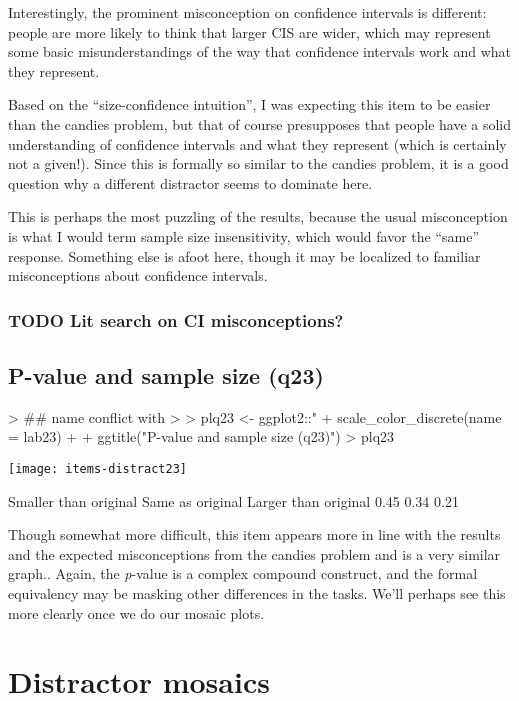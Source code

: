 \documentclass[11pt]{article}
\begin{document}
Interestingly, the prominent misconception on confidence intervals is different: people are more likely to think that larger CIS are wider, which may represent some basic misunderstandings of the way that confidence intervals work and what they represent.

Based on the ``size-confidence intuition'', I was expecting this item to be easier than the candies problem, but that of course presupposes that people have a solid understanding of confidence intervals and what they represent (which is certainly not a given!).  Since this is formally so similar to the candies problem, it is a good question why a different distractor seems to dominate here.

This is perhaps the most puzzling of the results, because the usual misconception is what I would term sample size insensitivity, which would favor the ``same'' response.  Something else is afoot here, though it may be localized to familiar misconceptions about confidence intervals.

\subsubsection{{\bfseries\sffamily TODO} Lit search on CI misconceptions?}
\label{sec-2-3-1}
\subsection{P-value and sample size (q23)}
\label{sec-2-4}

\begin{Schunk}
\begin{Sinput}
> ## name conflict with %+%, which is why I need to use colon notation here
> 
> plq23 <- ggplot2::"%+%"(plq06, d23) + 
+     scale_color_discrete(name = lab23) +
+     ggtitle("P-value and sample size (q23)")
> plq23
\end{Sinput}
\end{Schunk}
\texttt{[image: items-distract23]}
\begin{Schunk}
\begin{Soutput}
Smaller than original      Same as original  Larger than original 
                 0.45                  0.34                  0.21 
\end{Soutput}
\end{Schunk}

Though somewhat more difficult, this item appears more in line with the results and the expected misconceptions from the candies problem and is a very similar graph.. Again, the \emph{p}-value is a complex compound construct, and the formal equivalency may be masking other differences in the tasks.  We'll perhaps see this more clearly once we do our mosaic plots.
\section{Distractor mosaics}
\label{sec-3}
\end{document}
